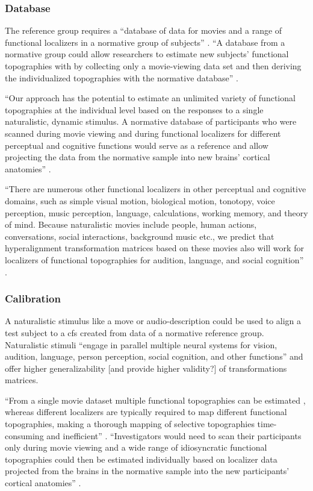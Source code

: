 \subsubsection{Database}
%
The reference group requires a ``database of data for movies and a range of
functional localizers in a normative group of subjects''
\citep{jiahui2020predicting}.
%
``A database from a normative group could allow researchers to estimate new
subjects' functional topographies with by collecting only a movie-viewing data
set and then deriving the individualized topographies with the normative
database'' \citep{jiahui2020predicting}.

%
``Our approach has the potential to estimate an unlimited variety of functional
topographies at the individual level based on the responses to a single
naturalistic, dynamic stimulus.
%
A normative database of participants who were scanned during movie viewing and
during functional localizers for different perceptual and cognitive functions
would serve as a reference and allow projecting the data from the normative
sample into new brains' cortical anatomies'' \citep{jiahui2020predicting}.

%
``There are numerous other functional localizers in other perceptual and
cognitive domains, such as simple visual motion, biological motion, tonotopy,
voice perception, music perception, language, calculations, working memory, and
theory of mind.
%
Because naturalistic movies include people, human actions, conversations, social
interactions, background music etc., we predict that hyperalignment
transformation matrices based on these movies also will work for localizers of
functional topographies for audition, language, and social cognition''
\citep{jiahui2020predicting}.


\subsubsection{Calibration}
%
A naturalistic stimulus like a move or audio-description could be used to align
a test subject to a \ac{cfs} created from data of a normative reference group.
%
Naturalistic stimuli ``engage in parallel multiple neural systems for vision,
audition, language, person perception, social cognition, and other functions''
\citep{jiahui2020predicting} and offer higher generalizability [and provide
higher validity?] of transformations matrices.

%
``From a single movie dataset multiple functional topographies can be estimated
\citep{guntupalli2016model}, whereas different localizers are typically required
to map different functional topographies, making a thorough mapping of selective
topographies time-consuming and inefficient'' \citep{jiahui2020predicting}.
%
``Investigators would need to scan their participants only during movie viewing
and a wide range of idiosyncratic functional topographies could then be
estimated individually based on localizer data projected from the brains in the
normative sample into the new participants' cortical anatomies''
\citep{jiahui2020predicting}.



